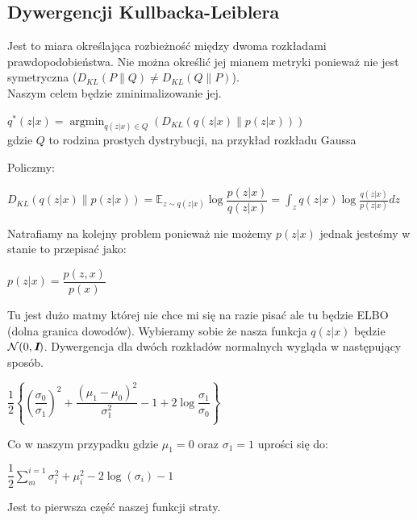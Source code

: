 \documentclass[a4paper,12pt]{book} %
\begin{document}
\subsection{Dywergencji Kullbacka-Leiblera}
Jest to miara określająca rozbieżność między dwoma rozkładami prawdopodobieństwa. Nie można określić jej mianem metryki ponieważ nie jest symetryczna ($D_{KL}(P\|Q)\neq  D_{KL}(Q\|P)$).\\ Naszym celem będzie zminimalizowanie jej.
\begin{center}
	$q^\ast(z|x)=\operatorname*{argmin}_{q(z|x)\in Q}(D_{KL}(q(z|x)\|p(z|x)))$
	\\gdzie $Q$ to rodzina prostych dystrybucji, na przykład rozkładu Gaussa 
\end{center}
Policzmy:
\begin{center}
	$D_{KL}(q(z|x)\|p(z|x))=\mathbb{E}_{z\sim q(z|x)}\log\dfrac{p(z|x)}{q(z|x)} = 
	\displaystyle\int_{z}^{}q(z|x)\log\frac{q(z|x)}{p(z|x)}dz$
\end{center}
	 Natrafiamy na kolejny problem ponieważ nie możemy $p(z|x)$ jednak jesteśmy w stanie to przepisać jako:\\
\begin{center}
	$p(z|x)=\dfrac{p(z,x)}{p(x)}$
\end{center}
Tu jest dużo matmy której nie chce mi się na razie pisać ale tu będzie ELBO (dolna granica dowodów).
\newpage
Wybieramy sobie że nasza funkcja $q(z|x)$ będzie $\mathcal{N}(0, \textit{\textbf{I}})$.
Dywergencja dla dwóch rozkładów normalnych wygląda w następujący sposób. 
\begin{center}
	$\dfrac{1}{2}\left\{\left(\dfrac{\sigma_0}{\sigma_1}\right)^2+\dfrac{(\mu_1 - \mu_0)^2}{\sigma_1^2} - 1 + 2\log\dfrac{\sigma_1}{\sigma_0}\right\}$
\end{center}
Co w naszym przypadku gdzie $\mu_1 = 0$ oraz $\sigma_1=1$ uprości się do:
\begin{center}
	$\dfrac{1}{2}\displaystyle\sum_{m}^{i=1}\sigma_i^2+\mu_i^2-2\log(\sigma_i)-1$
\end{center} 
Jest to pierwsza część naszej funkcji straty. 
\newpage
\end{document}
